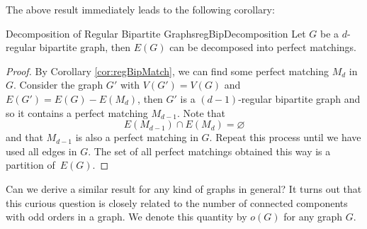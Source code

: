 \documentclass[math]{amznotes}
\theoremstyle{remark}
\begin{document}
The above result immediately leads to the following corollary:
\begin{corbox}{Decomposition of Regular Bipartite Graphs}{regBipDecomposition}
    Let $G$ be a $d$-regular bipartite graph, then $E(G)$ can be decomposed into perfect matchings.
    \tcblower
    \begin{proof}
        By Corollary \ref{cor:regBipMatch}, we can find some perfect matching $M_d$ in $G$. Consider the graph $G'$ with $V(G') = V(G)$ and $E(G') = E(G) - E(M_d)$, then $G'$ is a $(d - 1)$-regular bipartite graph and so it contains a perfect matching $M_{d - 1}$. Note that
        \begin{equation*}
            E(M_{d - 1}) \cap E(M_d) = \varnothing
        \end{equation*}
        and that $M_{d - 1}$ is also a perfect matching in $G$. Repeat this process until we have used all edges in $G$. The set of all perfect matchings obtained this way is a partition of~$E(G)$.
    \end{proof}
\end{corbox}
Can we derive a similar result for any kind of graphs in general? It turns out that this curious question is closely related to the number of connected components with odd orders in a graph. We denote this quantity by $o(G)$ for any graph $G$.
\end{document}
